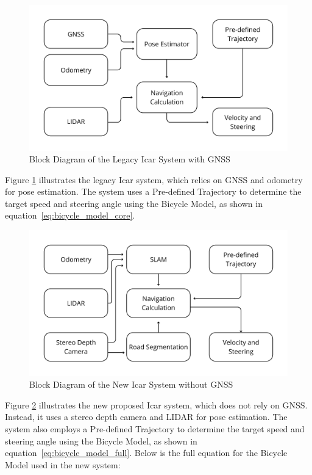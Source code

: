 \documentclass[conference]{IEEEtran}
\begin{document}
\begin{figure}[H]
	\centering
	\includegraphics[width=\linewidth]{../konten/full_sys1.png}
	\caption{Block Diagram of the Legacy Icar System with GNSS}
	\label{fig:full_system}
\end{figure}
\FloatBarrier

Figure \ref{fig:full_system} illustrates the legacy Icar system, which relies on GNSS and odometry for pose estimation. The system uses a Pre-defined Trajectory to determine the target speed and steering angle using the Bicycle Model, as shown in equation~\ref{eq:bicycle_model_core}.

\begin{figure}[H]
	\centering
	\includegraphics[width=\linewidth]{../konten/full_sys_slam1.png}
	\caption{Block Diagram of the New Icar System without GNSS}
	\label{fig:full_system_slam}
\end{figure}

Figure \ref{fig:full_system_slam} illustrates the new proposed Icar system, which does not rely on GNSS. Instead, it uses a stereo depth camera and LIDAR for pose estimation. The system also employs a Pre-defined Trajectory to determine the target speed and steering angle using the Bicycle Model, as shown in equation~\ref{eq:bicycle_model_full}. Below is the full equation for the Bicycle Model used in the new system:
\end{document}
